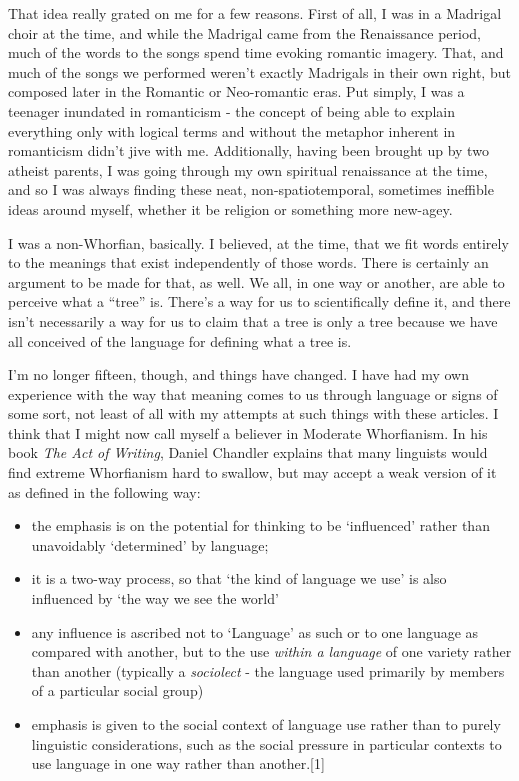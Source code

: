 That idea really grated on me for a few reasons. First of all, I was in
a Madrigal choir at the time, and while the Madrigal came from the
Renaissance period, much of the words to the songs spend time evoking
romantic imagery. That, and much of the songs we performed weren't
exactly Madrigals in their own right, but composed later in the Romantic
or Neo-romantic eras. Put simply, I was a teenager inundated in
romanticism - the concept of being able to explain everything only with
logical terms and without the metaphor inherent in romanticism didn't
jive with me. Additionally, having been brought up by two atheist
parents, I was going through my own spiritual renaissance at the time,
and so I was always finding these neat, non-spatiotemporal, sometimes
ineffible ideas around myself, whether it be religion or something more
new-agey.

I was a non-Whorfian, basically. I believed, at the time, that we fit
words entirely to the meanings that exist independently of those words.
There is certainly an argument to be made for that, as well. We all, in
one way or another, are able to perceive what a ``tree'' is. There's a
way for us to scientifically define it, and there isn't necessarily a
way for us to claim that a tree is only a tree because we have all
conceived of the language for defining what a tree is.

I'm no longer fifteen, though, and things have changed. I have had my
own experience with the way that meaning comes to us through language or
signs of some sort, not least of all with my attempts at such things
with these articles. I think that I might now call myself a believer in
Moderate Whorfianism. In his book \emph{The Act of Writing}, Daniel
Chandler explains that many linguists would find extreme Whorfianism
hard to swallow, but may accept a weak version of it as defined in the
following way:

\begin{itemize}
\tightlist
\item
  the emphasis is on the potential for thinking to be `influenced'
  rather than unavoidably `determined' by language;
\item
  it is a two-way process, so that `the kind of language we use' is also
  influenced by `the way we see the world'
\item
  any influence is ascribed not to `Language' as such or to one language
  as compared with another, but to the use \emph{within a language} of
  one variety rather than another (typically a \emph{sociolect} - the
  language used primarily by members of a particular social group)
\item
  emphasis is given to the social context of language use rather than to
  purely linguistic considerations, such as the social pressure in
  particular contexts to use language in one way rather than
  another.{[}1{]}
\end{itemize}

